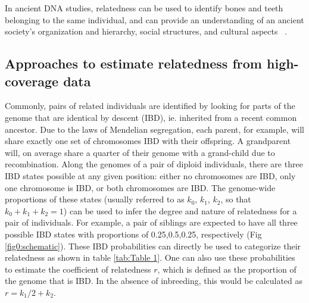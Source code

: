 \documentclass[12pt, letterpaper]{article}
\begin{document}
In ancient DNA studies, relatedness can be used to identify bones and teeth belonging to the same individual, and can provide an understanding of an ancient society's organization and hierarchy, social structures, and cultural aspects ~\cite{baca_ancient_2012,mittnik_KINship-based_2019,sikora_ancient_2017}.


\subsection{Approaches to estimate relatedness from high-coverage data}

Commonly, pairs of related individuals are identified by looking for parts of the genome that are identical by descent (IBD), ie. inherited from a recent common ancestor. Due to the laws of Mendelian segregation, each parent, for example, will share exactly one set of chromosomes IBD with their offspring. A grandparent will, on average share a quarter of their genome with a grand-child due to recombination. Along the genomes of a pair of diploid individuals, there are three IBD states possible at any given position: either no chromosomes are IBD, only one chromosome is IBD, or both chromosomes are IBD. The genome-wide proportions of these states (usually referred to as $k_0$, $k_1$, $k_2$, so that $k_0+k_1+k_2=1$) can be used to infer the degree and nature of relatedness for a pair of individuals. For example, a pair of siblings are expected to have all three possible IBD states with proportions of 0.25,0.5,0.25, respectively (Fig \ref{fig0:schematic}). These IBD probabilities can directly be used to categorize their relatedness as shown in table \ref{tab:Table 1}. One can also use these probabilities to estimate the coefficient of relatedness $r$, which is defined as the proportion of the genome that is IBD. In the absence of inbreeding, this would be calculated as $r= k_1/2 + k_2$.
\end{document}
